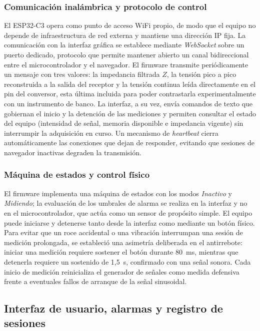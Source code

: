 \documentclass[12pt,a4paper]{article}
\begin{document}
\subsubsection{Comunicación inalámbrica y protocolo de control}

El ESP32-C3 opera como punto de acceso WiFi propio, de modo que el equipo no depende de infraestructura
de red externa y mantiene una dirección IP fija. La comunicación con la interfaz gráfica se establece
mediante \textit{WebSocket} sobre un puerto dedicado, protocolo que permite mantener abierto un canal
bidireccional entre el microcontrolador y el navegador. El firmware transmite periódicamente un mensaje
con tres valores: la impedancia filtrada $Z$, la tensión pico a pico reconstruida a la salida del
receptor y la tensión continua leída directamente en el pin del conversor, esta última incluida para
poder contrastarla experimentalmente con un instrumento de banco. La interfaz, a su vez, envía comandos
de texto que gobiernan el inicio y la detención de las mediciones y permiten consultar el estado del
equipo (intensidad de señal, memoria disponible e impedancia vigente) sin interrumpir la adquisición en
curso. Un mecanismo de \textit{heartbeat} cierra automáticamente las conexiones que dejan de responder,
evitando que sesiones de navegador inactivas degraden la transmisión.

\subsubsection{Máquina de estados y control físico}

El firmware implementa una máquina de estados con los modos \textit{Inactivo} y \textit{Midiendo}; la
evaluación de los umbrales de alarma se realiza en la interfaz y no en el microcontrolador, que actúa
como un sensor de propósito simple. El equipo puede iniciarse y detenerse tanto desde la interfaz como
mediante un botón físico. Para evitar que un roce accidental o una vibración interrumpan una sesión de
medición prolongada, se estableció una asimetría deliberada en el antirrebote: iniciar una medición
requiere sostener el botón durante 80~ms, mientras que detenerla requiere un sostenido de 1,5~s,
confirmado con una señal sonora. Cada inicio de medición reinicializa el generador de señales como medida
defensiva frente a eventuales fallos de arranque de la señal sinusoidal.

\subsection{Interfaz de usuario, alarmas y registro de sesiones}
\end{document}

